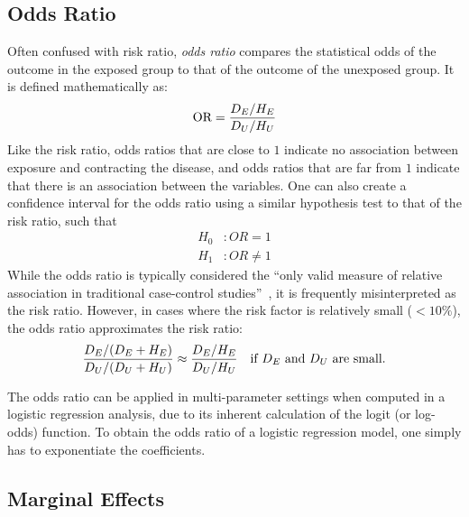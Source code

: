 \subsection{Odds Ratio}
\label{subsec:odds-ratio}
Often confused with risk ratio, \emph{odds ratio} compares the statistical odds of the outcome in the exposed group to that of the outcome of the unexposed group.
It is defined mathematically as:
\begin{align*}
 \text{OR} = \frac{D_{E} / H_{E}}{D_{U} / H_{U}}
\end{align*}
Like the risk ratio, odds ratios that are close to $1$ indicate no association between exposure and contracting the disease, and odds ratios that are far from $1$ indicate that there is an association between the variables.
One can also create a confidence interval for the odds ratio using a similar hypothesis test to that of the risk ratio, such that
\begin{align*}
    H_0&: OR = 1 \\
    H_1&: OR \neq 1
\end{align*}
While the odds ratio is typically considered the \enquote{only valid measure of relative association in traditional case-control studies}~\citep{Relative-Measures-of-Association-for-Binary-Outcomes}, it is frequently misinterpreted as the risk ratio.
However, in cases where the risk factor is relatively small ($< 10\%$), the odds ratio approximates the risk ratio:
\begin{align*}
    \frac{D_{E} / (D_{E} + H_{E})}{D_{U} / (D_{U} + H_{U})} \approx \frac{D_{E} / H_{E}}{D_{U} / H_{U}} & & \text{if } D_E \text{ and } D_U \text{ are small.}
\end{align*}

The odds ratio can be applied in multi-parameter settings when computed in a logistic regression analysis, due to its inherent calculation of the logit (or log-odds) function.
To obtain the odds ratio of a logistic regression model, one simply has to exponentiate the coefficients.


\subsection{Marginal Effects}\label{subsec:marginal-effects}


